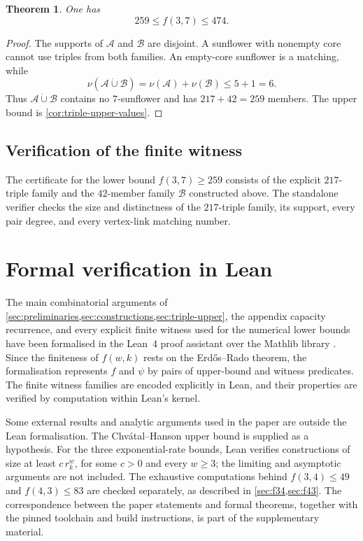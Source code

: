 \documentclass[11pt]{article}
\numberwithin{equation}{section}
\newtheorem{theorem}{Theorem}[section]
\theoremstyle{definition}
\theoremstyle{remark}
\newcommand{\A}{\mathcal A}
\newcommand{\B}{\mathcal B}
\newcommand{\dd}{\mathbin{\dot\cup}}
\begin{document}
\begin{theorem}
\label{thm:f37-bounds}
One has
\[
 259\le f(3,7)\le474.
\]
\end{theorem}

\begin{proof}
The supports of $\A$ and $\B$ are disjoint. A sunflower with nonempty core
cannot use triples from both families. An empty-core sunflower is a
matching, while
\[
 \nu(\A\dd\B)=\nu(\A)+\nu(\B)\le5+1=6.
\]
Thus $\A\dd\B$ contains no $7$-sunflower and has $217+42=259$ members.
The upper bound is \cref{cor:triple-upper-values}.
\end{proof}

\subsection{Verification of the finite witness}

The certificate for the lower bound $f(3,7)\ge259$ consists of the explicit
$217$-triple family and the $42$-member family $\B$ constructed above. The
standalone verifier checks the size and distinctness of the $217$-triple
family, its support, every pair degree, and every vertex-link matching
number.


\section{Formal verification in Lean}
\label{sec:lean}

The main combinatorial arguments of
\cref{sec:preliminaries,sec:constructions,sec:triple-upper}, the appendix
capacity recurrence, and every explicit finite witness used for the numerical
lower bounds have been formalised in the Lean~4 proof assistant
\cite{deMouraUllrich2021} over the Mathlib library \cite{mathlib2020}. Since
the finiteness of $f(w,k)$ rests on the Erd\H{o}s--Rado theorem, the
formalisation represents $f$ and $\psi$ by pairs of upper-bound and witness
predicates. The finite witness families are encoded explicitly in Lean,
and their properties are verified by computation within Lean's kernel.

Some external results and analytic arguments used in the paper are outside
the Lean formalisation. The Chv\'atal--Hanson upper bound is supplied as a
hypothesis. For the three exponential-rate bounds, Lean verifies
constructions of size at least $c\,r_k^w$, for some $c>0$ and every $w\ge3$;
the limiting and asymptotic arguments are not included. The exhaustive
computations behind $f(3,4)\le49$ and $f(4,3)\le83$ are checked separately,
as described in \cref{sec:f34,sec:f43}. The correspondence between the paper statements and
formal theorems, together with the pinned toolchain and build instructions,
is part of the supplementary material.
\end{document}
